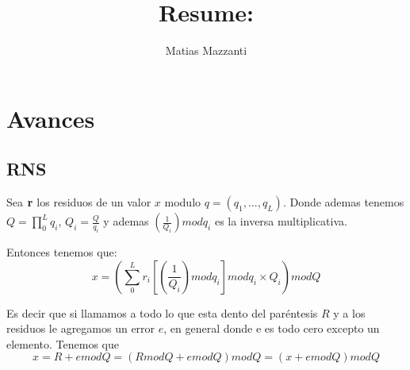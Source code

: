 \documentclass[12pt, oneside]{article}
\title{Resume: }
\author{Matias Mazzanti}
\date{}
\begin{document}
\maketitle
\tableofcontents

\section{Avances}

\subsection{RNS}

Sea $\bold{r}$ los residuos de un valor $x$ modulo $q = (q_1, ...,q_L)$.
Donde ademas tenemos $Q = \prod_0^L q_i$, $Q_i = \frac{Q}{q_i}$ y ademas $\left(\frac{1}{Q_{i}}\right)mod q_i$ es la inversa multiplicativa.

Entonces tenemos que:
\begin{equation}
    x = \left(\sum_0^L r_i\left[\left(\frac{1}{Q_{i}}\right)mod q_i\right]mod q_i \times Q_i\right) mod Q
\end{equation}

Es decir que si llamamos a todo lo que esta dento del paréntesis $R$ y a los residuos le agregamos un error $e$, en general donde e es todo cero excepto un elemento.
Tenemos que
\begin{equation}
    x = R + e mod Q = \left(R mod Q + e mod Q \right) mod Q = \left( x + e mod Q \right) mod Q
\end{equation}
\end{document}
